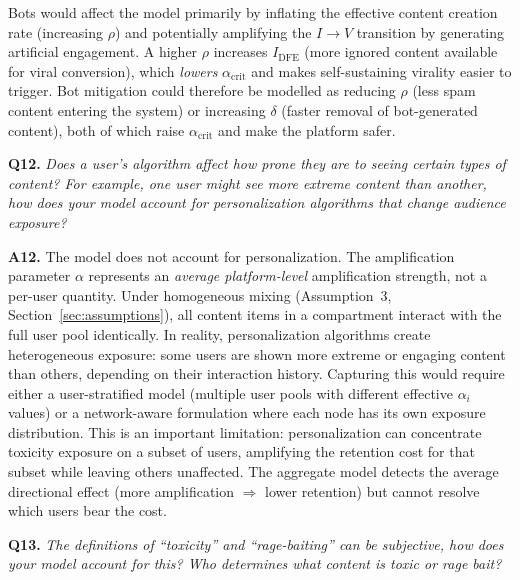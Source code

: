 \documentclass[11pt]{article}
\begin{document}
Bots would affect the model primarily by inflating the effective content creation rate (increasing $\rho$) and potentially amplifying the $I \to V$ transition by generating artificial engagement.
A higher $\rho$ increases $I_{\mathrm{DFE}}$ (more ignored content available for viral conversion), which \emph{lowers} $\alpha_{\mathrm{crit}}$ and makes self-sustaining virality easier to trigger.
Bot mitigation could therefore be modelled as reducing $\rho$ (less spam content entering the system) or increasing $\delta$ (faster removal of bot-generated content), both of which raise $\alpha_{\mathrm{crit}}$ and make the platform safer.

\bigskip

\noindent\textbf{Q12.} \textit{Does a user's algorithm affect how prone they are to seeing certain types of content? For example, one user might see more extreme content than another, how does your model account for personalization algorithms that change audience exposure?}

\medskip
\noindent\textbf{A12.}
The model does not account for personalization.
The amplification parameter $\alpha$ represents an \emph{average platform-level} amplification strength, not a per-user quantity.
Under homogeneous mixing (Assumption~3, Section~\ref{sec:assumptions}), all content items in a compartment interact with the full user pool identically.
In reality, personalization algorithms create heterogeneous exposure: some users are shown more extreme or engaging content than others, depending on their interaction history.
Capturing this would require either a user-stratified model (multiple user pools with different effective $\alpha_i$ values) or a network-aware formulation where each node has its own exposure distribution.
This is an important limitation: personalization can concentrate toxicity exposure on a subset of users, amplifying the retention cost for that subset while leaving others unaffected. The aggregate model detects the average directional effect (more amplification $\Rightarrow$ lower retention) but cannot resolve which users bear the cost.

\bigskip

\noindent\textbf{Q13.} \textit{The definitions of ``toxicity'' and ``rage-baiting'' can be subjective, how does your model account for this? Who determines what content is toxic or rage bait?}
\end{document}
